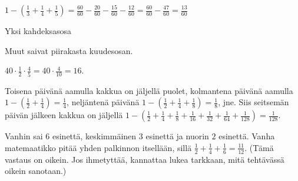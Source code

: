 \begin{Vastaus}{58}
            $1-(\frac{1}{3}+\frac{1}{4}+\frac{1}{5})
            = \frac{60}{60}-\frac{20}{60}-\frac{15}{60}-\frac{12}{60}
            = \frac{60}{60}-\frac{47}{60}
            = \frac{13}{60}$
        
\end{Vastaus}
\begin{Vastaus}{59}
			Yksi kahdeksasosa
        
\end{Vastaus}
\begin{Vastaus}{60}
            Muut saivat piirakasta kuudesosan.
        
\end{Vastaus}
\begin{Vastaus}{61}
    
\end{Vastaus}
\begin{Vastaus}{62}
		$40\cdot \frac{1}{2} \cdot \frac{4}{5}=40\cdot \frac{4}{10}= 16$.
	
\end{Vastaus}
\begin{Vastaus}{63}
		Toisena päivänä aamulla kakkua on jäljellä puolet, kolmantena päivänä aamulla
		$1-\left(\frac{1}{2} + \frac{1}{4}\right) = \frac{1}{4}$,
		neljäntenä päivänä
		$1-\left(\frac{1}{2} + \frac{1}{4} + \frac{1}{8}\right)
		= \frac{1}{8}$, jne.
		Siis seitsemän päivän jälkeen kakkua on jäljellä
		$1-\left(\frac{1}{2} + \frac{1}{4} + \frac{1}{8} +
		\frac{1}{16} + \frac{1}{32} + \frac{1}{64} + \frac{1}{128}\right)
		= \frac{1}{128}$.
	
\end{Vastaus}
\begin{Vastaus}{64}
		Vanhin sai $6$ esinettä, keskimmäinen $3$ esinettä ja nuorin $2$ esinettä. Vanha matemaatikko pitää yhden palkinnon itsellään, sillä $\frac{1}{2} + \frac{1}{4} + \frac{1}{6} = \frac{11}{12}$. (Tämä vastaus on oikein. Jos ihmetyttää, kannattaa lukea tarkkaan, mitä tehtävässä oikein sanotaan.)
	
\end{Vastaus}
\begin{Vastaus}{65}
	
\end{Vastaus}
\begin{Vastaus}{66}
	
\end{Vastaus}

